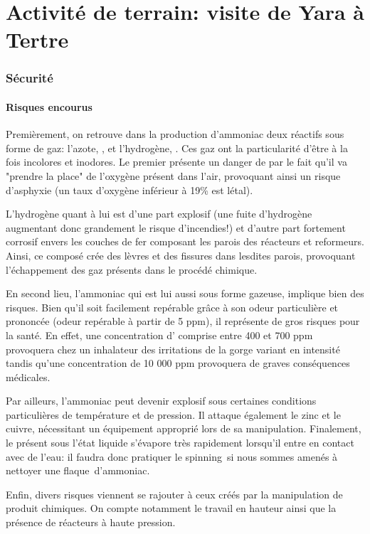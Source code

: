 \documentclass[a4paper,12pt, oneside]{article}
\begin{document}
\part*{Activité de terrain: visite de Yara à Tertre}
\section{Sécurité}
	\subsection{Risques encourus}
		Premièrement, on retrouve dans la production d'ammoniac deux réactifs sous forme de gaz: l'azote, , et l'hydrogène, . Ces gaz ont la particularité d'être à la fois incolores et inodores. Le premier présente un danger de par le fait qu'il va "prendre la place" de l'oxygène présent dans l'air, provoquant ainsi un risque d'asphyxie (un taux d'oxygène inférieur à 19\% est létal). 
		
		L'hydrogène quant à lui est d'une part explosif (une fuite d'hydrogène augmentant donc grandement le risque d'incendies!) et d'autre part fortement corrosif envers les couches de fer composant les parois des réacteurs et reformeurs. Ainsi, ce composé crée des lèvres et des fissures dans lesdites parois, provoquant l'échappement des gaz présents dans le procédé chimique.
		
		En second lieu, l'ammoniac qui est lui aussi sous forme gazeuse, implique bien des risques. Bien qu'il soit facilement repérable grâce à son odeur particulière et prononcée (odeur repérable à partir de 5 ppm), il représente de gros risques pour la santé. En effet, une concentration d' comprise entre 400 et 700 ppm provoquera chez un inhalateur des irritations de la gorge variant en intensité tandis qu'une concentration de 10 000 ppm provoquera de graves conséquences médicales.
		
		Par ailleurs, l'ammoniac peut devenir explosif sous certaines conditions particulières de température et de pression. Il attaque également le zinc et le cuivre, nécessitant un équipement approprié lors de sa manipulation. Finalement, le  présent sous l'état liquide s'évapore très rapidement lorsqu'il entre en contact avec de l'eau: il faudra donc pratiquer le \og spinning\fg \ si nous sommes amenés à nettoyer une \og flaque\fg \ d'ammoniac.
		
		Enfin, divers risques viennent se rajouter à ceux créés par la manipulation de produit chimiques. On compte notamment le travail en hauteur ainsi que la présence de réacteurs à haute pression.
		
\end{document}
